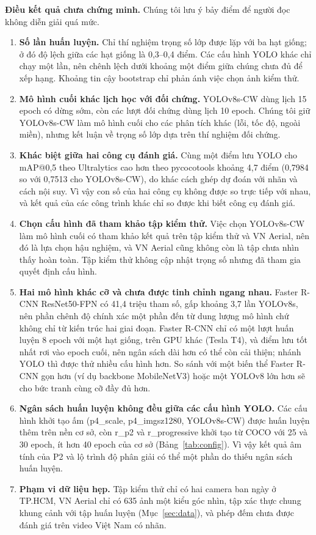 \documentclass[10pt,journal,a4paper]{IEEEtran}
\begin{document}
\textbf{Điều kết quả chưa chứng minh.} Chúng tôi lưu ý bảy điểm để người đọc không diễn giải quá mức.
\begin{enumerate}
\item \textbf{Số lần huấn luyện.} Chỉ thí nghiệm trọng số lớp được lặp với ba hạt giống; ở đó độ lệch giữa các hạt giống là 0,3--0,4 điểm. Các cấu hình YOLO khác chỉ chạy một lần, nên chênh lệch dưới khoảng một điểm giữa chúng chưa đủ để xếp hạng. Khoảng tin cậy bootstrap chỉ phản ánh việc chọn ảnh kiểm thử.
\item \textbf{Mô hình cuối khác lịch học với đối chứng.} YOLOv8s-CW dùng lịch 15 epoch có dừng sớm, còn các lượt đối chứng dùng lịch 10 epoch. Chúng tôi giữ YOLOv8s-CW làm mô hình cuối cho các phân tích khác (lỗi, tốc độ, ngoài miền), nhưng kết luận về trọng số lớp dựa trên thí nghiệm đối chứng.
\item \textbf{Khác biệt giữa hai công cụ đánh giá.} Cùng một điểm lưu YOLO cho mAP@0,5 theo Ultralytics cao hơn theo pycocotools khoảng 4,7 điểm (0,7984 so với 0,7513 cho YOLOv8s-CW), do khác cách ghép dự đoán với nhãn và cách nội suy. Vì vậy con số của hai công cụ không được so trực tiếp với nhau, và kết quả của các công trình khác chỉ so được khi biết công cụ đánh giá.
\item \textbf{Chọn cấu hình đã tham khảo tập kiểm thử.} Việc chọn YOLOv8s-CW làm mô hình cuối có tham khảo kết quả trên tập kiểm thử và VN Aerial, nên đó là lựa chọn hậu nghiệm, và VN Aerial cũng không còn là tập chưa nhìn thấy hoàn toàn. Tập kiểm thử không cập nhật trọng số nhưng đã tham gia quyết định cấu hình.
\item \textbf{Hai mô hình khác cỡ và chưa được tinh chỉnh ngang nhau.} Faster R-CNN ResNet50-FPN có 41,4 triệu tham số, gấp khoảng 3,7 lần YOLOv8s, nên phần chênh độ chính xác một phần đến từ dung lượng mô hình chứ không chỉ từ kiến trúc hai giai đoạn. Faster R-CNN chỉ có một lượt huấn luyện 8 epoch với một hạt giống, trên GPU khác (Tesla T4), và điểm lưu tốt nhất rơi vào epoch cuối, nên ngân sách dài hơn có thể còn cải thiện; nhánh YOLO thì được thử nhiều cấu hình hơn. So sánh với một biến thể Faster R-CNN gọn hơn (ví dụ backbone MobileNetV3) hoặc một YOLOv8 lớn hơn sẽ cho bức tranh cùng cỡ đầy đủ hơn.
\item \textbf{Ngân sách huấn luyện không đều giữa các cấu hình YOLO.} Các cấu hình khởi tạo ấm (p4\_scale, p4\_imgsz1280, YOLOv8s-CW) được huấn luyện thêm trên nền cơ sở, còn r\_p2 và r\_progressive khởi tạo từ COCO với 25 và 30 epoch, ít hơn 40 epoch của cơ sở (Bảng~\ref{tab:config}). Vì vậy kết quả âm tính của P2 và lộ trình độ phân giải có thể một phần do thiếu ngân sách huấn luyện.
\item \textbf{Phạm vi dữ liệu hẹp.} Tập kiểm thử chỉ có hai camera ban ngày ở TP.HCM, VN Aerial chỉ có 635 ảnh một kiểu góc nhìn, tập xác thực chung khung cảnh với tập huấn luyện (Mục~\ref{sec:data}), và phép đếm chưa được đánh giá trên video Việt Nam có nhãn.
\end{enumerate}
\end{document}
